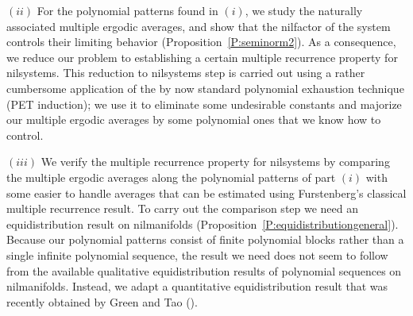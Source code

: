 \documentclass[11pt]{amsart}
\theoremstyle{plain}
\theoremstyle{definition}
\theoremstyle{remark}
\begin{document}
$(ii)$ For the polynomial patterns found in $(i)$, we study the
naturally associated multiple ergodic averages, and show that the
nilfactor of the system controls their limiting behavior
(Proposition~\ref{P:seminorm2}). As a consequence, we reduce our problem to
 establishing a certain multiple recurrence property for
nilsystems. This reduction to nilsystems step is carried out using a rather
cumbersome application of the by now standard polynomial exhaustion technique (PET induction);
we use it  to eliminate some undesirable constants and majorize our multiple ergodic averages
 by some polynomial ones that we know how to control.


$(iii)$ We verify the multiple recurrence property for nilsystems
by
comparing the multiple ergodic averages along the polynomial patterns of
part $(i)$ with some easier to handle averages that can be estimated
using Furstenberg's classical multiple recurrence result.  To carry out
the comparison step we need
 an equidistribution result on nilmanifolds
(Proposition~\ref{P:equidistributiongeneral}).  Because our
polynomial patterns consist of finite polynomial blocks rather than a
single infinite polynomial sequence, the result we
need does not seem to follow from the available qualitative
equidistribution results of polynomial sequences on nilmanifolds.
Instead, we adapt a quantitative equidistribution result that was
recently obtained by Green and Tao (\cite{GT}).
\end{document}
